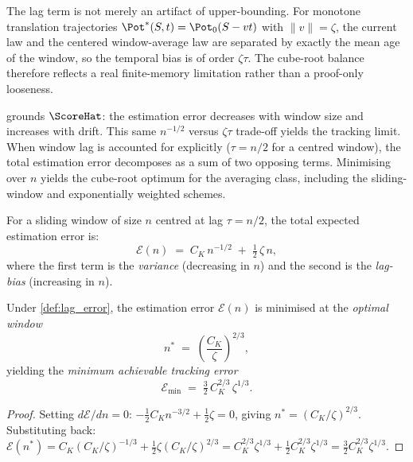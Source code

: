\begin{remark}\label{rem:lag_tight}
The lag term is not merely an artifact of upper-bounding. For monotone
translation trajectories $\Pot^*(S,t)=\Pot_0(S-vt)$ with $\|v\|=\zeta$,
the current law and the centered window-average law are separated by exactly the
mean age of the window, so the temporal bias is of order $\zeta\tau$.
The cube-root balance therefore reflects a real finite-memory limitation rather
than a proof-only looseness.
\end{remark}

 grounds $\ScoreHat$: the estimation error
decreases with window size and increases with drift. This same
$n^{-1/2}$ versus $\zeta\tau$ trade-off yields the tracking limit.
When window lag is accounted for explicitly ($\tau = n/2$ for a centred
window), the total estimation error decomposes as a sum of two opposing terms.
Minimising over $n$ yields the cube-root optimum for the averaging class,
including the sliding-window and exponentially weighted schemes.

\begin{definition}\label{def:lag_error}
For a sliding window of size $n$ centred at lag $\tau = n/2$, the
total expected estimation error is:
\[
  \mathcal{E}(n) \;=\; C_K\, n^{-1/2} \;+\; \tfrac{1}{2}\,\zeta\, n,
\]
where the first term is the \emph{variance} (decreasing in $n$) and the
second is the \emph{lag-bias} (increasing in $n$).
\end{definition}

\begin{proposition}%
\label{prop:coherence_delay}
Under \cref{def:lag_error}, the estimation error $\mathcal{E}(n)$ is
minimised at the \emph{optimal window}
\[
  n^* \;=\; \left(\frac{C_K}{\zeta}\right)^{2/3},
\]
yielding the \emph{minimum achievable tracking error}
\[
  \mathcal{E}_{\min} \;=\; \tfrac{3}{2}\,C_K^{2/3}\,\zeta^{1/3}.
\]
\end{proposition}

\begin{proof}
Setting $d\mathcal{E}/dn = 0$:
$-\tfrac{1}{2}C_K n^{-3/2} + \tfrac{1}{2}\zeta = 0$,
giving $n^* = (C_K/\zeta)^{2/3}$.
Substituting back:
$\mathcal{E}(n^*) = C_K(C_K/\zeta)^{-1/3} + \tfrac{1}{2}\zeta(C_K/\zeta)^{2/3}
= C_K^{2/3}\zeta^{1/3} + \tfrac{1}{2}C_K^{2/3}\zeta^{1/3}
 = \tfrac{3}{2}C_K^{2/3}\zeta^{1/3}$.
\end{proof}

